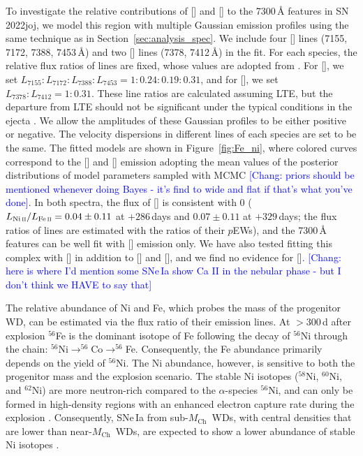 \documentclass[twocolumn]{aastex631}
\newcommand{\sn}{SN\,2022joj}
\newcommand{\Mch}{$M_\mathrm{Ch}$}
\newcommand{\chang}[1]{\textcolor{blue}{[Chang: #1]}}
\begin{document}
\begin{CJK*}{UTF8}{gbsn}
To investigate the relative contributions of [] and [] to the 7300\,\r{A} features in \sn, we model this region with multiple Gaussian emission profiles using the same technique as in Section~\ref{sec:analysis_spec}. We include four [] lines (7155, 7172, 7388, 7453\,\r{A}) and two [] lines (7378, 7412\,\r{A}) in the fit. For each species, the relative flux ratios of lines are fixed, whose values are adopted from \citet{Jerkstrand_2015}. For [], we set $L_{7155}:L_{7172}:L_{7388}:L_{7453} = 1:0.24:0.19:0.31$, and for [], we set $L_{7378}:L_{7412} = 1:0.31$. These line ratios are calculated assuming LTE, but the departure from LTE should not be significant under the typical conditions in the ejecta \citep{Jerkstrand_2015}. We allow the amplitudes of these Gaussian profiles to be either positive or negative. The velocity dispersions in different lines of each species are set to be the same. The fitted models are shown in Figure~\ref{fig:Fe_ni}, where colored curves correspond to the [] and [] emission adopting the mean values of the posterior distributions of model parameters sampled with MCMC \chang{priors should be mentioned whenever doing Bayes - it's find to wide and flat if that's what you've done}. In both spectra, the flux of [] is consistent with 0 (${L_{\mathrm{Ni}\,\textsc{ii}}}/{L_{\mathrm{Fe}\,\textsc{ii}}}=0.04\pm0.11$ at $+286$\,days and $0.07\pm0.11$ at $+329$\,days; the flux ratios of lines are estimated with the ratios of their $p$EWs), and the 7300\,\r{A} features can be well fit with [] emission only. We have also tested fitting this complex with [] in addition to [] and [], and we find no evidence for []. \chang{here is where I'd mention some SNe\,Ia show Ca II in the nebular phase - but I don't think we HAVE to say that}

The relative abundance of Ni and Fe, which probes the mass of the progenitor WD, can be estimated via the flux ratio of their emission lines. At $>$300\,d after explosion $^{56}$Fe is the dominant isotope of Fe following the decay of $^{56}$Ni through the chain: $^{56}$Ni$\rightarrow^{56}$Co$\rightarrow^{56}$Fe. Consequently, the Fe abundance primarily depends on the yield of $^{56}$Ni. The Ni abundance, however, is sensitive to both the progenitor mass and the explosion scenario. The stable Ni isotopes ($^{58}$Ni, $^{60}$Ni, and $^{62}$Ni) are more neutron-rich compared to the $\alpha$-species $^{56}$Ni, and can only be formed in high-density regions with an enhanced electron capture rate during the explosion \citep{Nomoto_1984,Khokhlov_1991}. Consequently, SNe\,Ia from sub-\Mch\ WDs, with central densities that are lower than near-\Mch\ WDs, are expected to show a lower abundance of stable Ni isotopes \citep{Iwamoto_1999,Seitenzahl_2013,Shen_DD_2018}. 


\end{CJK*}
\end{document}
